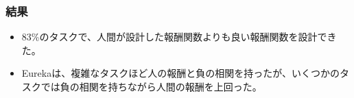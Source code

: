 \documentclass[dvipdfmx,12pt]{beamer}%
\begin{document}
\begin{frame}
\frametitle{結果}
\begin{itemize}
\item 83\%のタスクで、人間が設計した報酬関数よりも良い報酬関数を設計できた。
\item Eurekaは、複雑なタスクほど人の報酬と負の相関を持ったが、いくつかのタスクでは負の相関を持ちながら人間の報酬を上回った。
\end{itemize}
\end{frame}

\end{document}
